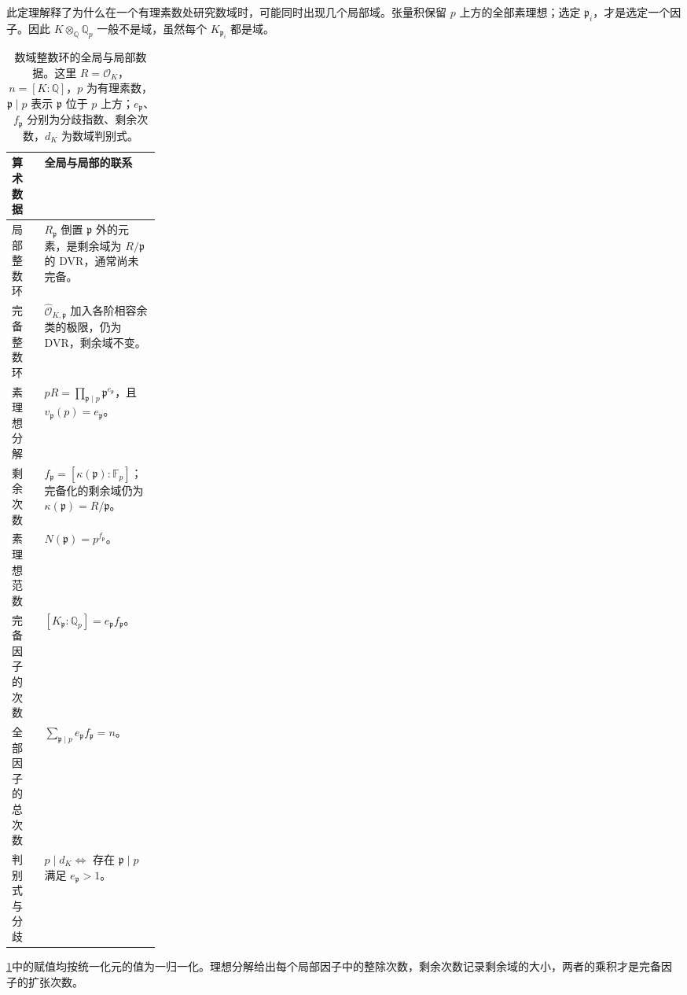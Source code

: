 此定理解释了为什么在一个有理素数处研究数域时，可能同时出现几个局部域。张量积保留 \(p\) 上方的全部素理想；选定 \(\mathfrak p_i\)，才是选定一个因子。因此 \(K\otimes_{\mathbb Q}\mathbb Q_p\) 一般不是域，虽然每个 \(K_{\mathfrak p_i}\) 都是域。

\begin{table}[htbp]
	\centering
	\caption[数域整数环的全局与局部数据]{数域整数环的全局与局部数据。这里 \(R=\mathcal O_K\)，\(n=[K:\mathbb Q]\)，\(p\) 为有理素数，\(\mathfrak p\mid p\) 表示 \(\mathfrak p\) 位于 \(p\) 上方；\(e_{\mathfrak p}\)、\(f_{\mathfrak p}\) 分别为分歧指数、剩余次数，\(d_K\) 为数域判别式。}
	\label{b3:tab:number-field-global-local-dictionary}
	\begin{tabularx}{\linewidth}{@{}>{\raggedright\arraybackslash}p{0.22\linewidth}X@{}}
		\toprule
		算术数据 & 全局与局部的联系 \\
		\midrule
		局部整数环 & \(R_{\mathfrak p}\) 倒置 \(\mathfrak p\) 外的元素，是剩余域为 \(R/\mathfrak p\) 的 DVR，通常尚未完备。 \\
		完备整数环 & \(\widehat{\mathcal O}_{K,\mathfrak p}\) 加入各阶相容余类的极限，仍为 DVR，剩余域不变。 \\
		素理想分解 & \(pR=\prod_{\mathfrak p\mid p}\mathfrak p^{e_{\mathfrak p}}\)，且 \(v_{\mathfrak p}(p)=e_{\mathfrak p}\)。 \\
		剩余次数 & \(f_{\mathfrak p}=[\kappa(\mathfrak p):\mathbb F_p]\)；完备化的剩余域仍为 \(\kappa(\mathfrak p)=R/\mathfrak p\)。 \\
		素理想范数 & \(N(\mathfrak p)=p^{f_{\mathfrak p}}\)。 \\
		完备因子的次数 & \([K_{\mathfrak p}:\mathbb Q_p]=e_{\mathfrak p}f_{\mathfrak p}\)。 \\
		全部因子的总次数 & \(\sum_{\mathfrak p\mid p}e_{\mathfrak p}f_{\mathfrak p}=n\)。 \\
		判别式与分歧 & \(p\mid d_K\Longleftrightarrow\) 存在 \(\mathfrak p\mid p\) 满足 \(e_{\mathfrak p}>1\)。 \\
		\bottomrule
	\end{tabularx}
\end{table}

\cref{b3:tab:number-field-global-local-dictionary}中的赋值均按统一化元的值为一归一化。理想分解给出每个局部因子中的整除次数，剩余次数记录剩余域的大小，两者的乘积才是完备因子的扩张次数。

